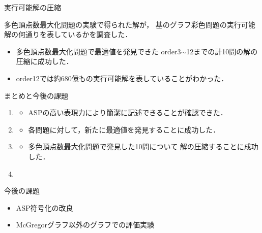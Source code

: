 \documentclass[dvipdfmx,11pt]{beamer}
\begin{document}
\begin{frame}{実行可能解の圧縮}
 \begin{block}{}
  多色頂点数最大化問題の実験で得られた解が，
  基のグラフ彩色問題の実行可能解の何通りを表しているかを調査した．
 \end{block}
 
 \begin{center}
  
 \end{center}

 \begin{itemize}
  \item 多色頂点数最大化問題で最適値を発見できた
        order3$\sim$12までの計10問の解の圧縮に成功した．
  \item order12では約680億もの実行可能解を表していることがわかった．
 \end{itemize}

\end{frame}


\begin{frame}{まとめと今後の課題}

 \begin{enumerate}
  \item {}
        \begin{itemize}
         \item ASPの高い表現力により簡潔に記述できることが確認できた．
        \end{itemize}
  \item {}
        \begin{itemize}
         \item 各問題に対して，新たに最適値を発見することに成功した．
        \end{itemize}
  \item {}
        \begin{itemize}
         \item 多色頂点数最大化問題で発見した10問について
               解の圧縮することに成功した．
        \end{itemize}
  \item {}
 \end{enumerate}

 \begin{block}{今後の課題}
  \begin{itemize}
   \item ASP符号化の改良
   \item McGregorグラフ以外のグラフでの評価実験
  \end{itemize}
 \end{block}
 
\end{frame}
\end{document}
